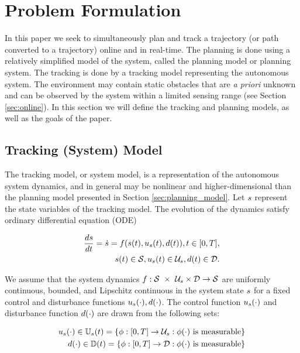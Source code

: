 \section{Problem Formulation \label{sec:formulation}}
In this paper we seek to simultaneously plan and track a trajectory (or path converted to a trajectory) online and in real-time. 
The planning is done using a relatively simplified model of the system, called the planning model or planning system. 
The tracking is done by a tracking model representing the autonomous system. 
The environment may contain static obstacles that are \textit{a priori} unknown and can be observed by the system within a limited sensing range (see Section \ref{sec:online}). 
In this section we will define the tracking and planning models, as well as the goals of the paper.

\subsection{Tracking (System) Model}
The tracking model, or system model, is a representation of the autonomous system dynamics, and in general may be nonlinear and higher-dimensional than the planning model presented in Section \ref{sec:planning_model}. 
Let $s$ represent the state variables of the tracking model. 
The evolution of the dynamics satisfy ordinary differential equation (ODE)

\begin{equation}
\begin{aligned}
\label{eq:tdyn}
\frac{d\tstate}{d\tvar} = \dot{\tstate} = \tdyn(\tstate(\tvar), \tctrl(\tvar), \dstb(\tvar)), \tvar \in [0, \thor], \\
\tstate(\tvar) \in \tset, \tctrl(\tvar) \in \tcset, \dstb(\tvar) \in \dset.
\end{aligned}
\end{equation}

We assume that the system dynamics $f : \mathcal{S}\ \times\ \mathcal{U}_s \times \mathcal{D} \rightarrow \mathcal{S}$ are uniformly continuous, bounded, and Lipschitz continuous in the system state $s$ for a fixed control and disturbance functions $u_s(\cdot), d(\cdot)$. The control function $u_s(\cdot)$ and disturbance function $d(\cdot)$ are drawn from the following sets:

\begin{equation}
\begin{aligned}
u_s(\cdot) \in \mathbb{U}_s(t) = \{\phi: [0, T] \rightarrow \mathcal{U}_s: \phi(\cdot) \text{ is measurable}\}\\
d(\cdot) \in \mathbb{D}(t) = \{\phi: [0, T] \rightarrow \mathcal{D}: \phi(\cdot) \text{ is measurable}\}
\end{aligned}
\end{equation}

